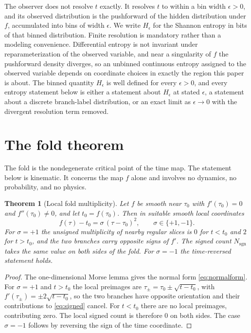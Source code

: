 \documentclass[aps,pre,reprint,nofootinbib]{revtex4-2}
\newtheorem{theorem}{Theorem}
\begin{document}
The observer does not resolve $t$ exactly.  It resolves $t$ to within a bin
width $\epsilon > 0$, and its observed distribution is the pushforward of
the hidden distribution under $f$, accumulated into bins of width
$\epsilon$.  We write $H_\epsilon$ for the Shannon entropy in bits of that
binned distribution.  Finite resolution is mandatory rather than a modeling
convenience.  Differential entropy is not invariant under reparameterization
of the observed variable, and near a singularity of $f$ the pushforward
density diverges, so an unbinned continuous entropy assigned to the observed
variable depends on coordinate choices in exactly the region this paper is
about.  The binned quantity $H_\epsilon$ is well defined for every
$\epsilon > 0$, and every entropy statement below is either a statement
about $H_\epsilon$ at stated $\epsilon$, a statement about a discrete
branch-label distribution, or an exact limit as $\epsilon \to 0$ with the
divergent resolution term removed.

\section{The fold theorem}
\label{sec:fold}

The fold is the nondegenerate critical point of the time map.  The
statement below is kinematic.  It concerns the map $f$ alone and involves
no dynamics, no probability, and no physics.

\begin{theorem}[Local fold multiplicity]
\label{thm:fold}
Let $f$ be smooth near $\tau_0$ with $f'(\tau_0) = 0$ and
$f''(\tau_0) \neq 0$, and let $t_0 = f(\tau_0)$.  Then in suitable smooth
local coordinates
\begin{equation}
  f(\tau) - t_0 = \sigma\,(\tau - \tau_0)^2,
  \qquad \sigma \in \{+1, -1\}.
  \label{eq:normalform}
\end{equation}
For $\sigma = +1$ the unsigned multiplicity of nearby regular slices is $0$
for $t < t_0$ and $2$ for $t > t_0$, and the two branches carry opposite
signs of $f'$.  The signed count $N_{\mathrm{sgn}}$ takes the same value on
both sides of the fold.  For $\sigma = -1$ the time-reversed statement
holds.
\end{theorem}

\begin{proof}
The one-dimensional Morse lemma gives the normal form
\eqref{eq:normalform}.  For $\sigma = +1$ and $t > t_0$ the local preimages
are $\tau_\pm = \tau_0 \pm \sqrt{t - t_0}$, with
$f'(\tau_\pm) = \pm 2\sqrt{t - t_0}$, so the two branches have opposite
orientation and their contributions to \eqref{eq:signed} cancel.  For
$t < t_0$ there are no local preimages, contributing zero.  The local signed
count is therefore $0$ on both sides.  The case $\sigma = -1$ follows by
reversing the sign of the time coordinate.
\end{proof}
\end{document}
